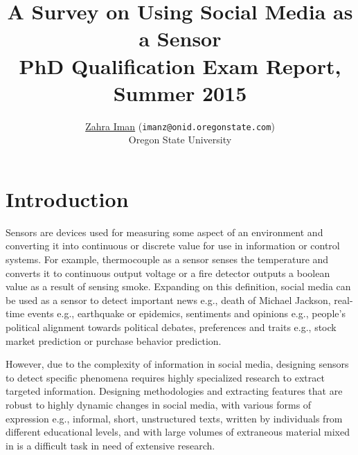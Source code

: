 \documentclass[11pt,a4paper]{article}
\begin{document}
\title{\bf A Survey on Using Social Media as a Sensor \\
\large PhD Qualification Exam Report, Summer 2015}
\author{
 \href{http://web.engr.oregonstate.edu/~imanz/}{Zahra Iman} (\texttt{imanz@onid.oregonstate.com}) \\
Oregon State University
}
\date{}

\maketitle

\vspace{-5mm}

\begin{abstract}

\end{abstract}

\vspace{-3mm}

\setcounter{tocdepth}{3}
\tableofcontents


\section{Introduction}

Sensors are devices used for measuring some aspect of an environment and converting it into continuous or discrete value for use in information or control systems. For example, thermocouple as a sensor senses the temperature and converts it to continuous output voltage or a fire detector outputs a boolean value as a result of sensing smoke. Expanding on this definition, social media can be used as a sensor to detect important news e.g., death of Michael Jackson, real-time events e.g., earthquake or epidemics, sentiments and opinions e.g., people's political alignment towards political debates, preferences and traits e.g., stock market prediction or purchase behavior prediction.

However, due to the complexity of information in social media, designing sensors to detect specific phenomena requires highly specialized research to extract targeted information. Designing methodologies and extracting features that are robust to highly dynamic changes in social media, with various forms of expression e.g., informal, short, unstructured texts, written by individuals from different educational levels, and with large volumes of extraneous material mixed in is a difficult task in need of extensive research. 
\end{document}
